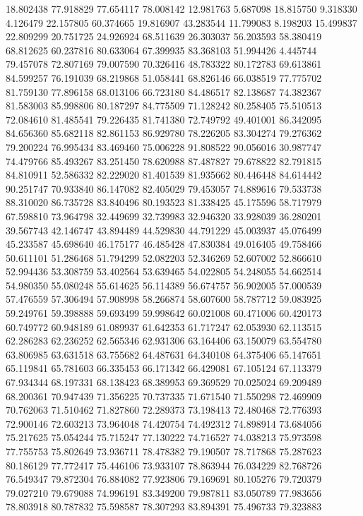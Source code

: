 18.802438
77.918829
77.654117
78.008142
12.981763
5.687098
18.815750
9.318330
4.126479
22.157805
60.374665
19.816907
43.283544
11.799083
8.198203
15.499837
22.809299
20.751725
24.926924
68.511639
26.303037
56.203593
58.380419
68.812625
60.237816
80.633064
67.399935
83.368103
51.994426
4.445744
79.457078
72.807169
79.007590
70.326416
48.783322
80.172783
69.613861
84.599257
76.191039
68.219868
51.058441
68.826146
66.038519
77.775702
81.759130
77.896158
68.013106
66.723180
84.486517
82.138687
74.382367
81.583003
85.998806
80.187297
84.775509
71.128242
80.258405
75.510513
72.084610
81.485541
79.226435
81.741380
72.749792
49.401001
86.342095
84.656360
85.682118
82.861153
86.929780
78.226205
83.304274
79.276362
79.200224
76.995434
83.469460
75.006228
91.808522
90.056016
30.987747
74.479766
85.493267
83.251450
78.620988
87.487827
79.678822
82.791815
84.810911
52.586332
82.229020
81.401539
81.935662
80.446448
84.614442
90.251747
70.933840
86.147082
82.405029
79.453057
74.889616
79.533738
88.310020
86.735728
83.840496
80.193523
81.338425
45.175596
58.717979
67.598810
73.964798
32.449699
32.739983
32.946320
33.928039
36.280201
39.567743
42.146747
43.894489
44.529830
44.791229
45.003937
45.076499
45.233587
45.698640
46.175177
46.485428
47.830384
49.016405
49.758466
50.611101
51.286468
51.794299
52.082203
52.346269
52.607002
52.866610
52.994436
53.308759
53.402564
53.639465
54.022805
54.248055
54.662514
54.980350
55.080248
55.614625
56.114389
56.674757
56.902005
57.000539
57.476559
57.306494
57.908998
58.266874
58.607600
58.787712
59.083925
59.249761
59.398888
59.693499
59.998642
60.021008
60.471006
60.420173
60.749772
60.948189
61.089937
61.642353
61.717247
62.053930
62.113515
62.286283
62.236252
62.565346
62.931306
63.164406
63.150079
63.554780
63.806985
63.631518
63.755682
64.487631
64.340108
64.375406
65.147651
65.119841
65.781603
66.335453
66.171342
66.429081
67.105124
67.113379
67.934344
68.197331
68.138423
68.389953
69.369529
70.025024
69.209489
68.200361
70.947439
71.356225
70.737335
71.671540
71.550298
72.469909
70.762063
71.510462
71.827860
72.289373
73.198413
72.480468
72.776393
72.900146
72.603213
73.964048
74.420754
74.492312
74.898914
73.684056
75.217625
75.054244
75.715247
77.130222
74.716527
74.038213
75.973598
77.755753
75.802649
73.936711
78.478382
79.190507
78.717868
75.287623
80.186129
77.772417
75.446106
73.933107
78.863944
76.034229
82.768726
76.549347
79.872304
76.884082
77.923806
79.169691
80.105276
79.720379
79.027210
79.679088
74.996191
83.349200
79.987811
83.050789
77.983656
78.803918
80.787832
75.598587
78.307293
83.894391
75.496733
79.323883
